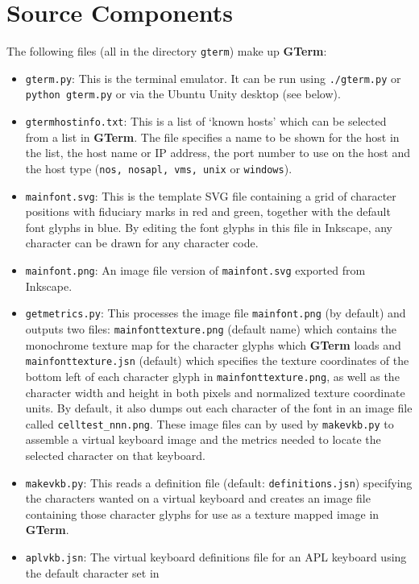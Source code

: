\documentclass[a4paper,twoside,11pt]{article}
\begin{document}
\section{Source Components}
The following files (all in the directory \texttt{gterm}) make up \textbf{GTerm}:
\begin{itemize}
\item \texttt{gterm.py}: This is the terminal emulator. It can be run using \texttt{./gterm.py} or \texttt{python gterm.py} 
      or via the Ubuntu Unity desktop (see below).
\item \texttt{gtermhostinfo.txt}: This is a list of `known hosts' which can be selected from a list in \textbf{GTerm}. The file
      specifies a name to be shown for the host in the list, the host name or IP address, the port number to use on the
      host and the host type (\texttt{nos, nosapl, vms, unix} or \texttt{windows}). 
\item \texttt{mainfont.svg}: This is the template SVG file containing a grid of character positions with fiduciary marks in
      red and green, together with the default font glyphs in blue. By editing the font glyphs in this file in
      Inkscape, any character can be drawn for any character code.
\item \texttt{mainfont.png}: An image file version of \texttt{mainfont.svg} exported from Inkscape.
\item \texttt{getmetrics.py}: This processes the image file \texttt{mainfont.png} (by default) and outputs two files:
      \texttt{mainfonttexture.png}
      (default name) which contains the monochrome texture map for the character glyphs which \textbf{GTerm} loads and 
      \texttt{mainfonttexture.jsn} (default) which specifies the texture coordinates of the bottom left of each character glyph
      in \texttt{mainfonttexture.png}, as well as the character width and height in both pixels and normalized texture
      coordinate units. By default, it also dumps out each character of the font in an image file called
      \texttt{celltest\_nnn.png}. These image files can by used by \texttt{makevkb.py}
      to assemble a virtual keyboard image and the metrics
      needed to locate the selected character on that keyboard.
\item \texttt{makevkb.py}: This reads a definition file (default: \texttt{definitions.jsn})
      specifying the characters wanted on a virtual
      keyboard and creates an image file containing those character glyphs for use as a texture mapped image in \textbf{GTerm}.
\item \texttt{aplvkb.jsn}: The virtual keyboard definitions file for an APL keyboard using the default character set in

\end{itemize}
\end{document}
